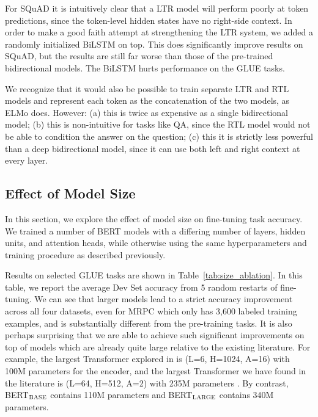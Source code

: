 \documentclass[11pt,a4paper]{article}
\newcommand\bertbase{BERT$_{\small \textsc{BASE}}$\xspace}
\newcommand\bertlarge{BERT$_{\small \textsc{LARGE}}$\xspace}
\begin{document}
For SQuAD it is intuitively clear that a LTR model will perform poorly at token predictions, since the token-level hidden states have no right-side context.
In order to make a good faith attempt at strengthening the LTR system, we added a randomly initialized BiLSTM on top. This does significantly improve results on SQuAD, but the results are still far worse than those of the pre-trained bidirectional models. The BiLSTM hurts performance on the GLUE tasks. 

We recognize that it would also be possible to train separate LTR and RTL models and represent each token as the concatenation of the two models, as ELMo does. However: (a) this is twice as expensive as a single bidirectional model; (b) this is non-intuitive for tasks like QA, since the RTL model would not be able to condition the answer on the question; (c) this it is strictly less powerful than a deep bidirectional model, since it can use both left and right context at every layer.


\subsection{Effect of Model Size}
\label{sec:model_size_ablation}

In this section, we explore the effect of model size on fine-tuning task accuracy. We trained a number of BERT models with a differing number of layers, hidden units, and attention heads, while otherwise using the same hyperparameters and training procedure as described previously.

Results on selected GLUE tasks are shown in Table~\ref{tab:size_ablation}. In this table, we report the average Dev Set accuracy from 5 random restarts of fine-tuning. We can see that larger models lead to a strict accuracy improvement across all four datasets, even for MRPC which only has 3,600 labeled training examples, and is substantially different from the pre-training tasks. It is also perhaps surprising that we are able to achieve such significant improvements on top of models which are already quite large relative to the existing literature. For example, the largest Transformer explored in \citet{vaswani-etal:2017:_atten} is (L=6, H=1024, A=16) with 100M parameters for the encoder, and the largest Transformer we have found in the literature is (L=64, H=512, A=2) with 235M parameters \cite{alrfou:2018}. By contrast, \bertbase contains 110M parameters and \bertlarge contains 340M parameters.
\end{document}
